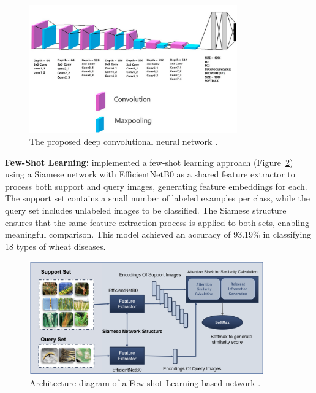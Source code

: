 \begin{figure}[H] 
    \centering
    \includegraphics[width=0.8\textwidth]{chapters/chapter3/images/Figure05.png}
    \caption{The proposed deep convolutional neural network \parencite{goyal2021leaf}.}
    \label{fig:CustomDeepCN}
\end{figure}



\textbf{Few-Shot Learning:} \parencite{alharbi2023wheat} implemented a few-shot learning approach (Figure~\ref{fig:Few-shot}) using a Siamese network with EfficientNetB0 as a shared feature extractor to process both support and query images, generating feature embeddings for each. The support set contains a small number of labeled examples per class, while the query set includes unlabeled images to be classified. The Siamese structure ensures that the same feature extraction process is applied to both sets, enabling meaningful comparison. This model achieved an accuracy of 93.19\% in classifying 18 types of wheat diseases.


\begin{figure}[H] 
    \centering
    \includegraphics[width=0.9\textwidth]{chapters/chapter3/images/Figure06.png}
    \caption{Architecture diagram of a Few-shot Learning-based network \parencite{alharbi2023wheat}.}
    \label{fig:Few-shot}
\end{figure}


